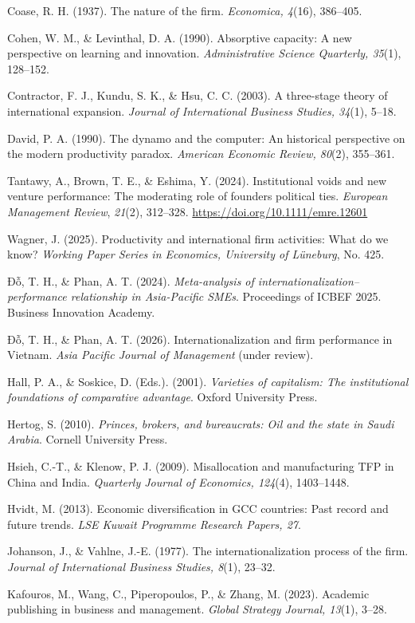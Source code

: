 \documentclass[12pt,a4paper]{article}
\begin{document}
Coase, R. H. (1937). The nature of the firm. \emph{Economica, 4}(16),
386--405.

Cohen, W. M., \& Levinthal, D. A. (1990). Absorptive capacity: A new
perspective on learning and innovation. \emph{Administrative Science
Quarterly, 35}(1), 128--152.

Contractor, F. J., Kundu, S. K., \& Hsu, C. C. (2003). A three-stage
theory of international expansion. \emph{Journal of International
Business Studies, 34}(1), 5--18.

David, P. A. (1990). The dynamo and the computer: An historical
perspective on the modern productivity paradox. \emph{American Economic
Review, 80}(2), 355--361.

Tantawy, A., Brown, T. E., \& Eshima, Y. (2024). Institutional voids and
new venture performance: The moderating role of
founders\textquotesingle{} political ties. \emph{European Management
Review}, \emph{21}(2), 312--328.
\url{https://doi.org/10.1111/emre.12601}

Wagner, J. (2025). Productivity and international firm activities: What
do we know? \emph{Working Paper Series in Economics, University of
Lüneburg}, No. 425.

Đỗ, T. H., \& Phan, A. T. (2024). \emph{Meta-analysis of
internationalization--performance relationship in Asia-Pacific SMEs}.
Proceedings of ICBEF 2025. Business Innovation Academy.

Đỗ, T. H., \& Phan, A. T. (2026). Internationalization and firm
performance in Vietnam. \emph{Asia Pacific Journal of Management} (under
review).

Hall, P. A., \& Soskice, D. (Eds.). (2001). \emph{Varieties of
capitalism: The institutional foundations of comparative advantage}.
Oxford University Press.

Hertog, S. (2010). \emph{Princes, brokers, and bureaucrats: Oil and the
state in Saudi Arabia}. Cornell University Press.

Hsieh, C.-T., \& Klenow, P. J. (2009). Misallocation and manufacturing
TFP in China and India. \emph{Quarterly Journal of Economics, 124}(4),
1403--1448.

Hvidt, M. (2013). Economic diversification in GCC countries: Past record
and future trends. \emph{LSE Kuwait Programme Research Papers, 27}.

Johanson, J., \& Vahlne, J.-E. (1977). The internationalization process
of the firm. \emph{Journal of International Business Studies, 8}(1),
23--32.

Kafouros, M., Wang, C., Piperopoulos, P., \& Zhang, M. (2023). Academic
publishing in business and management. \emph{Global Strategy Journal,
13}(1), 3--28.
\end{document}
